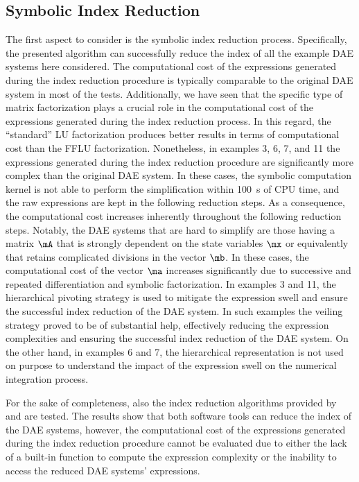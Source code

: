 \subsection{Symbolic Index Reduction}

The first aspect to consider is the symbolic index reduction process. Specifically, the presented algorithm can successfully reduce the index of all the example \ac{DAE} systems here considered. The computational cost of the expressions generated during the index reduction procedure is typically comparable to the original \ac{DAE} system in most of the tests. Additionally, we have seen that the specific type of matrix factorization plays a crucial role in the computational cost of the expressions generated during the index reduction process. In this regard, the ``standard'' \ac{LU} factorization produces better results in terms of computational cost than the \ac{FFLU} factorization. Nonetheless, in examples 3, 6, 7, and 11 the expressions generated during the index reduction procedure are significantly more complex than the original \ac{DAE} system. In these cases, the \Maple{} symbolic computation kernel is not able to perform the simplification within \SI{100}{\second} of \ac{CPU} time, and the raw expressions are kept in the following reduction steps. As a consequence, the computational cost increases inherently throughout the following reduction steps. Notably, the \ac{DAE} systems that are hard to simplify are those having a matrix $\mA$ that is strongly dependent on the state variables $\mx$ or equivalently that retains complicated divisions in the vector $\mb$. In these cases, the computational cost of the vector $\ma$ increases significantly due to successive and repeated differentiation and symbolic factorization. In examples 3 and 11, the hierarchical pivoting strategy is used to mitigate the expression swell and ensure the successful index reduction of the \ac{DAE} system. In such examples the veiling strategy proved to be of substantial help, effectively reducing the expression complexities and ensuring the successful index reduction of the \ac{DAE} system. On the other hand, in examples 6 and 7, the hierarchical representation is not used on purpose to understand the impact of the expression swell on the numerical integration process.

For the sake of completeness, also the index reduction algorithms provided by \Matlab{} and \Mathematica{} are tested. The results show that both software tools can reduce the index of the \ac{DAE} systems, however, the computational cost of the expressions generated during the index reduction procedure cannot be evaluated due to either the lack of a built-in function to compute the expression complexity or the inability to access the reduced \ac{DAE} systems' expressions.

